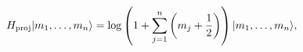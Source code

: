 \begin{equation}
H_{\rm proj}|m_1,\ldots, m_n\rangle = \log\left(1+\sum_{j=1}^n 
\left(m_j + {1\over 2}\right)\right)|m_1,\ldots, m_n\rangle,
\label{oeggpp}
\end{equation}

